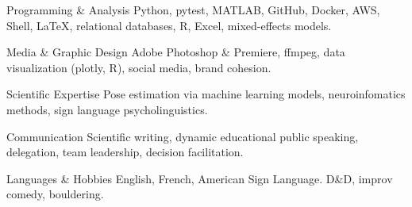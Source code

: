 

\begin{cvskills}

  \cvskill
    {Programming \& Analysis} %
    {Python, pytest, MATLAB, GitHub, Docker, AWS, Shell, \LaTeX, relational databases, R, Excel, mixed-effects models.} %

  \cvskill
    {Media \& Graphic Design} %
    {Adobe Photoshop \& Premiere, ffmpeg, data visualization (plotly, R), social media, brand cohesion.} %

  \cvskill
    {Scientific Expertise} %
    {Pose estimation via machine learning models, neuroinfomatics methods, sign language psycholinguistics.} %

  \cvskill
    {Communication} %
    {Scientific writing, dynamic educational public speaking, delegation, team leadership, decision facilitation.} %


  \cvskill
    {Languages \& Hobbies} %
    {English, French, American Sign Language. D\&D, improv comedy, bouldering.} %

\end{cvskills}
